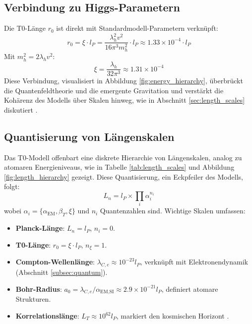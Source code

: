 \documentclass[12pt,a4paper]{article}
\begin{document}
	\subsection{Verbindung zu Higgs-Parametern}
	\label{subsec:higgs}
	
	Die T0-Länge \(r_0\) ist direkt mit Standardmodell-Parametern verknüpft:
	\[
	r_0 = \xi \cdot l_P = \frac{\lambda_h^2 v^2}{16 \pi^3 m_h^2} \cdot l_P \approx 1.33 \times 10^{-4} \cdot l_P
	\]
	Mit \(m_h^2 = 2 \lambda_h v^2\):
	\[
	\xi = \frac{\lambda_h}{32 \pi^3} \approx 1.31 \times 10^{-4}
	\]
	Diese Verbindung, visualisiert in Abbildung \ref{fig:energy_hierarchy}, überbrückt die Quantenfeldtheorie und die emergente Gravitation und verstärkt die Kohärenz des Modells über Skalen hinweg, wie in Abschnitt \ref{sec:length_scales} diskutiert \cite{pascher_higgs_2025}.
	
	\subsection{Quantisierung von Längenskalen}
	\label{subsec:quantization}
	
	Das T0-Modell offenbart eine diskrete Hierarchie von Längenskalen, analog zu atomaren Energieniveaus, wie in Tabelle \ref{tab:length_scales} und Abbildung \ref{fig:length_hierarchy} gezeigt. Diese Quantisierung, ein Eckpfeiler des Modells, folgt:
	\[
	L_n = l_P \times \prod_i \alpha_i^{n_i}
	\]
	wobei \(\alpha_i = \{\alpha_{\text{EM}}, \beta_T, \xi\}\) und \(n_i\) Quantenzahlen sind. Wichtige Skalen umfassen:
	\begin{itemize}
		\item \textbf{Planck-Länge}: \(L_n = l_P\), \(n_i = 0\).
		\item \textbf{T0-Länge}: \(r_0 = \xi \cdot l_P\), \(n_\xi = 1\).
		\item \textbf{Compton-Wellenlänge}: \(\lambda_{C,e} \approx 10^{-23} l_P\), verknüpft mit Elektronendynamik (Abschnitt \ref{subsec:quantum}).
		\item \textbf{Bohr-Radius}: \(a_0 = \lambda_{C,e} / \alpha_{\text{EM,SI}} \approx 2.9 \times 10^{-21} l_P\), definiert atomare Strukturen.
		\item \textbf{Korrelationslänge}: \(L_T \approx 10^{62} l_P\), markiert den kosmischen Horizont \cite{pascher_planck_2025}.
	\end{itemize}
	
	\par %
	
\end{document}
